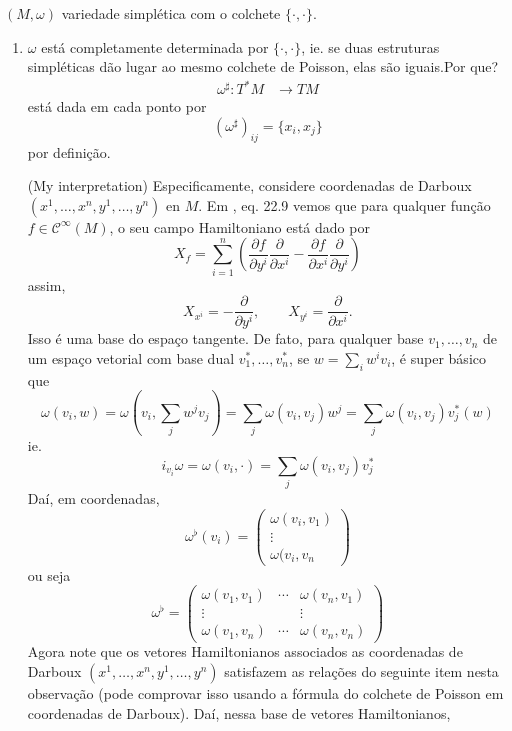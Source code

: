 $(M,\omega)$ variedade simpl\'etica com o colchete $\{\cdot ,\cdot \}$.

\begin{remark}\leavevmode
	\begin{enumerate}
		\item $\omega$ est\'a completamente determinada por $\{\cdot ,\cdot \}$, ie. se duas estruturas simpl\'eticas d\~ao lugar ao mesmo colchete de Poisson, elas s\~ao iguais.Por que?
			\begin{align*}
				\omega^\sharp: T^*M &\longrightarrow TM 
			\end{align*}
			est\'a dada em cada ponto por
			\[(\omega^\sharp )_{ij}=\{x_i,x_j\}\]
			por defini\c c\~ao.

			{\color{magenta}(My interpretation)} Especificamente, considere coordenadas de Darboux \\$(x^1,\ldots,x^n,y^1,\ldots,y^n)$ en $M$. Em \cite{lee}, eq. 22.9 vemos que para qualquer fun\c c\~ao $f \in\mathcal{C}^\infty(M)$, o seu campo Hamiltoniano est\'a dado por
			\[X_f=\sum_{i=1}^n\left( \frac{\partial f}{\partial y^i}\frac{\partial }{\partial x^i}-\frac{\partial f}{\partial x^i} \frac{\partial }{\partial y^i} \right) \]
			assim,
			\[X_{x^i}=-\frac{\partial }{\partial y^i},\qquad X_{y^i}=\frac{\partial }{\partial x^i}.\]
			Isso \'e uma base do espaço tangente. De fato, para qualquer base $v_1,\ldots,v_n$ de um espaço vetorial com base dual $v^*_1,\ldots,v_n^*$, se $w=\sum_{i}w^iv_i$, \'e super básico que
			\[\omega\left( v_i,w \right) =\omega\left( v_i,\sum_{j}w^jv_j \right) =\sum_{j}\omega(v_i,v_j)w^j=\sum_{j}\omega(v_i,v_j)v_j^*(w)\]
			ie.
			\[i_{v_i}\omega=\omega(v_i,\cdot )=\sum_{j}\omega(v_i,v_j)v_j^*\]
			Da\'i, em coordenadas,
			\[\omega^\flat(v_i)=\begin{pmatrix} \omega(v_i,v_1)\\\vdots \\\omega(v_i,v_{n} \end{pmatrix} \]
			ou seja
			\[\omega^\flat =\begin{pmatrix} \omega(v_1,v_1)&\cdots &\omega(v_n,v_1)\\
			\vdots &&\vdots \\
		\omega(v_1,v_n)&\cdots &\omega(v_n,v_n)\end{pmatrix} \]
		Agora note que os vetores Hamiltonianos associados as coordenadas de Darboux $(x^1,\ldots,x^n,y^1,\ldots,y^n)$ satisfazem as rela\c c\~oes do seguinte item nesta observa\c c\~ao (pode comprovar isso usando a fórmula do colchete de Poisson em coordenadas de Darboux). Da\'i, nessa base de vetores Hamiltonianos,


\end{enumerate}
\end{remark}
